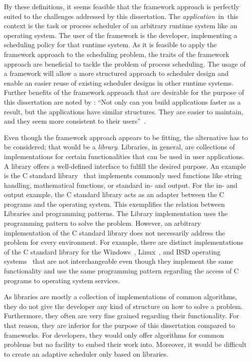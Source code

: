 By these definitions, it seems feasible that the framework approach is perfectly suited to the challenges addressed by this dissertation. The \emph{application}~in~this context is the task or process scheduler of an arbitrary runtime system like an operating system. The user of the framework is the developer, implementing a scheduling policy for that runtime system.
As it is feasible to apply the framework approach to the scheduling problem, the traits of the framework approach are beneficial to tackle the problem of process scheduling. The usage of a framework will allow a more structured approach to scheduler design and enable an easier reuse of existing scheduler designs in other runtime systems. Further benefits of the framework approach that are desirable for the purpose of this dissertation are noted by  \citeauthor{Gamma-1995-DesignPattnerns}: ``Not only can you build applications faster as a result, but the
applications have similar structures. They are easier to maintain, and they seem
more consistent to their
users''~\cite[27]{Gamma-1995-DesignPattnerns}.

Even though the framework approach appears to be fitting, the alternative has to be considered; that would be a \emph{library}. Libraries, in general, are collections of implementations for certain functionalities that can be used in user applications. A library offers a well-defined interface to fulfill the desired purpose. An example is the C standard library~\cite{C-2011} that implements commonly used functions like string handling, mathematical functions, or standard in- and output. For the in- and output example, the C standard library acts as an adapter between the C programs and the operating system. This exemplifies the relation between Libraries and programming patterns. The Library implementation uses the programming pattern to solve the problem. However, an arbitrary implementation of the C standard library does not necessarily address the problem for every environment. For example, there are distinct implementations of the C standard library for the Windows~\cite{WindowsC}, Linux~\cite{glibc}, and BSD operating systems~\cite{bsdlibc} that are not interchangeable even though they implement the same functionality and use the same programming pattern regarding the access of C programs to operating system services.

As libraries are mostly a collection of implementations of common algorithms, they do not give the developer any kind of structure on how to solve a problem. Furthermore, they often are very fine grained regarding their functionality. For that reason, they are inferior for the purpose of this dissertation compared to frameworks. For developers, they would only offer algorithms for common problems but no facility to embed their work into. Moreover, it would be difficult to create an adaptive scheduler only based on libraries.

